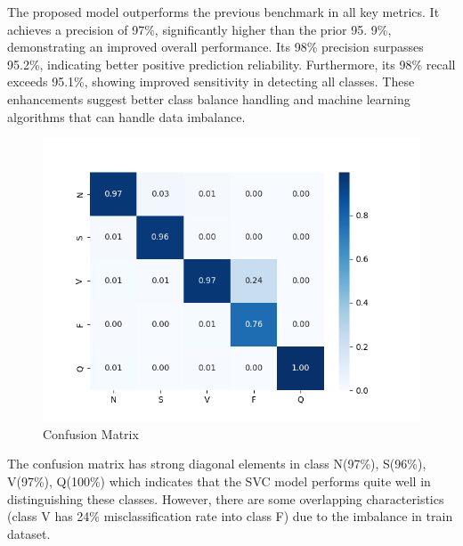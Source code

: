 \documentclass[a4paper,12pt]{article}
\begin{document}
The proposed model outperforms the previous benchmark in all key metrics. It achieves a precision of 97\%, significantly higher than the prior 95. 9\%, demonstrating an improved overall performance. Its 98\% precision surpasses 95.2\%, indicating better positive prediction reliability. Furthermore, its 98\% recall exceeds 95.1\%, showing improved sensitivity in detecting all classes. These enhancements suggest better class balance handling and machine learning algorithms that can handle data imbalance.

\begin{figure}[H]
    \centering
    \includegraphics[width=1\linewidth]{figures/Confusion_Matrix_applying_SMOTE.png}
    \caption{Confusion Matrix}
    \label{fig:enter-label}
\end{figure}

The confusion matrix has strong diagonal elements in class N(97\%), S(96\%), V(97\%), Q(100\%) which indicates that the SVC model performs quite well in distinguishing these classes. However, there are some overlapping characteristics (class V has 24\% misclassification rate into class F) due to the imbalance in train dataset. 
\end{document}
